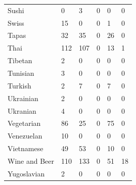 \documentclass[letterpaper,10pt]{article}
\begin{document}
\begin{table}[h]
\begin{minipage}{.5\textwidth}
\begin{tabular}{llllll}
Sushi & 0 & 3 & 0 & 0 & 0 \\
Swiss & 15 & 0 & 0 & 1 & 0 \\
Tapas & 32 & 35 & 0 & 26 & 0 \\
Thai & 112 & 107 & 0 & 13 & 1 \\
Tibetan & 2 & 0 & 0 & 0 & 0 \\
Tunisian & 3 & 0 & 0 & 0 & 0 \\
Turkish & 2 & 7 & 0 & 7 & 0 \\
Ukrainian & 2 & 0 & 0 & 0 & 0 \\
Ukranian & 4 & 0 & 0 & 0 & 0 \\
Vegetarian & 86 & 25 & 0 & 75 & 0 \\
Venezuelan & 10 & 0 & 0 & 0 & 0 \\
Vietnamese & 49 & 53 & 0 & 10 & 0 \\
Wine and Beer & 110 & 133 & 0 & 51 & 18 \\
Yugoslavian & 2 & 0 & 0 & 0 & 0
\end{tabular}
\end{minipage}
\end{table}
\end{document}
